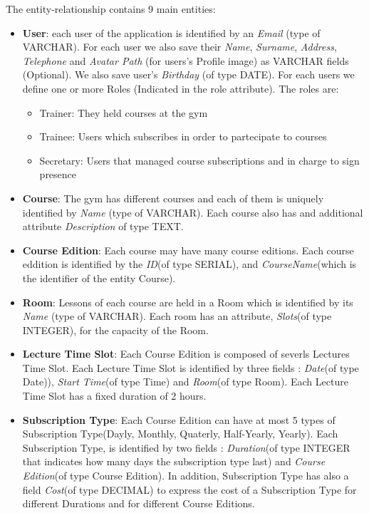    The entity-relationship contains 9 main entities:
    \begin{itemize}
        \item 
        \textbf{User}: each user of the application is identified by an \textit{Email} (type of VARCHAR). 
    	For each user we also save their \textit{Name}, \textit{Surname}, \textit{Address}, \textit{Telephone} and \textit{Avatar Path} (for users's Profile image) as VARCHAR fields (Optional). We also save user's \textit{Birthday} (of type DATE). For each users we define
        one or more Roles (Indicated in the role attribute). The roles are:
        \begin{itemize}
			\item Trainer: They held courses at the gym 
			\item Trainee: Users which subscribes in order to partecipate to courses
			\item Secretary: Users that managed course subscriptions and in charge to sign presence
        \end{itemize}
    	
    	\item \textbf{Course}: The gym has different courses and each of them is uniquely identified by \textit{Name} (type of VARCHAR). Each course also has and additional attribute \textit{Description} of type TEXT.
    	
    	\item \textbf{Course Edition}: Each course may have many course editions. Each course eddition is identified by the \textit{ID}(of type SERIAL), and \textit{CourseName}(which is the identifier of the entity Course).
    	
    	\item \textbf{Room}: Lessons of each course are held in a Room which is identified by its \textit{Name} (type of VARCHAR). Each room has an attribute, \textit{Slots}(of type INTEGER), for the capacity of the Room.
    	
    	\item \textbf{Lecture Time Slot}: Each Course Edition is composed of severls Lectures Time Slot. Each Lecture Time Slot is identified by three fields : \textit{Date}(of type Date)), \textit{Start Time}(of type Time) and \textit{Room}(of type Room). Each Lecture Time Slot has a fixed duration of 2 hours.
    	
    	\item \textbf{Subscription Type}: Each Course Edition can have at most 5 types of Subscription Type(Dayly, Monthly, Quaterly, Half-Yearly, Yearly). Each Subscription Type, is identified by two fields : \textit{Duration}(of type INTEGER that indicates how many days the subscription type last) and \textit{Course Edition}(of type Course Edition). In addition, Subscription Type has also a field \textit{Cost}(of type DECIMAL) to express the cost of a Subscription Type for different Durations and for different Course Editions.
    	

\end{itemize}
